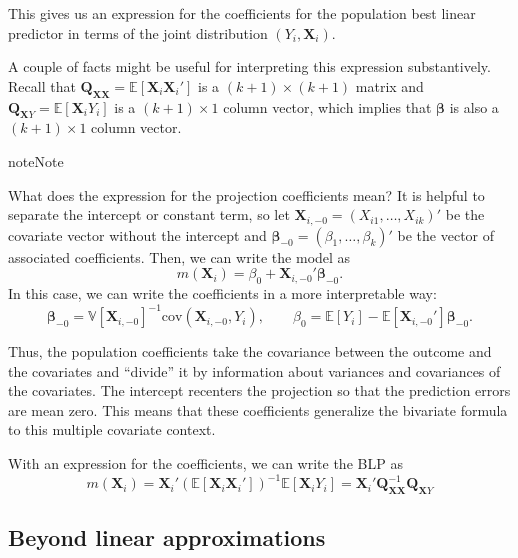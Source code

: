 \documentclass[
  13pt,
  letterpaper,
  DIV=11,
  numbers=noendperiod]{scrreprt}
\newcommand{\mb}{\bm}
\newcommand{\E}{\mathbb{E}}
\newcommand{\V}{\mathbb{V}}
\newcommand{\cov}{\text{cov}}
\newcommand{\X}{\mb{X}}
\newcommand{\bfbeta}{\mb{\beta}}
\theoremstyle{plain}
\theoremstyle{plain}
\theoremstyle{definition}
\theoremstyle{definition}
\theoremstyle{remark}
\begin{document}
This gives us an expression for the coefficients for the population best
linear predictor in terms of the joint distribution \((Y_{i}, \X_{i})\).

A couple of facts might be useful for interpreting this expression
substantively. Recall that \(\mb{Q}_{\mb{XX}} = \E[\X_{i}\X_{i}']\) is a
\((k+1) \times (k+1)\) matrix and \(\mb{Q}_{\X Y} = \E[\X_{i}Y_{i}]\) is
a \((k+1)\times 1\) column vector, which implies that \(\bfbeta\) is
also a \((k+1) \times 1\) column vector.

\begin{bookcallout}{note}{Note}

What does the expression for the projection coefficients mean? It is
helpful to separate the intercept or constant term, so let
\(\X_{i,-0} = (X_{i1}, \ldots, X_{ik})'\) be the covariate vector
without the intercept and \(\bfbeta_{-0} = (\beta_1, \ldots, \beta_k)'\)
be the vector of associated coefficients. Then, we can write the model
as \[ 
m(\X_i) = \beta_0 + \X_{i,-0}'\bfbeta_{-0}.
\] In this case, we can write the coefficients in a more interpretable
way: \[ 
\bfbeta_{-0} = \V[\X_{i,-0}]^{-1}\cov(\X_{i,-0}, Y_i), \qquad \beta_0 = \E[Y_i] - \E[\X_{i,-0}']\bfbeta_{-0}.
\]

Thus, the population coefficients take the covariance between the
outcome and the covariates and ``divide'' it by information about
variances and covariances of the covariates. The intercept recenters the
projection so that the prediction errors are mean zero. This means that
these coefficients generalize the bivariate formula to this multiple
covariate context.

\end{bookcallout}

With an expression for the coefficients, we can write the BLP as \[ 
m(\X_{i}) = \X_{i}'\left(\E[\X_{i}\X_{i}']\right)^{-1}\E[\X_{i}Y_{i}] = \X_{i}'\mb{Q}_{\mb{XX}}^{-1}\mb{Q}_{\mb{X}Y}
\]

\subsection{Beyond linear
approximations}\label{beyond-linear-approximations}
\end{document}
